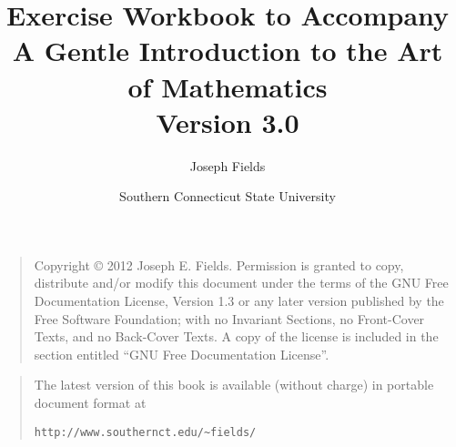 \documentclass[dvips,12pt,twoside]{book}
\begin{document}
\frontmatter

\title{Exercise Workbook to Accompany \\
A Gentle Introduction to the Art of Mathematics\\ {\small Version 3.0}}
\author{Joseph Fields}
\date{Southern Connecticut State University}

\maketitle

\clearpage

\rule{0pt}{0pt}

\vfill

\begin{quote}
    Copyright \copyright{}  2012  Joseph E. Fields.
    Permission is granted to copy, distribute and/or modify this document
    under the terms of the GNU Free Documentation License, Version 1.3
    or any later version published by the Free Software Foundation;
    with no Invariant Sections, no Front-Cover Texts, and no Back-Cover Texts.
    A copy of the license is included in the section entitled ``GNU
    Free Documentation License''.
\end{quote}

\vfill

\begin{quote}
The latest version of this book is available (without charge) in portable document format at \newline
\rule{0pt}{0pt} \hspace{1in} \verb+http://www.southernct.edu/~fields/+
\end{quote}

\vfill

\clearpage

\mainmatter











{}%

\end{document}
